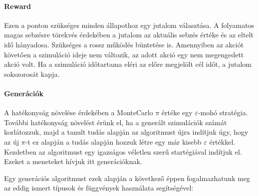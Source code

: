 \documentclass[12pt]{article}
\begin{document}
\paragraph{Reward} 
Ezen a ponton szükséges minden állapothoz egy jutalom választása. A folyamatos magas sebzésre törekvés érdekében a jutalom az aktuális sebzés értéke és az eltelt idő hányadosa. Szükséges a rossz működés büntetése is. Amennyiben az akciót követően a szimuláció ideje nem változik, az adott akció egy nem megengedett akció volt. Ha a szimuláció időtartama eléri az előre megjelölt cél időt, a jutalom sokszorosát kapja.

\paragraph{Generációk}
A hatékonyság növelése érdekében a MonteCarlo $\pi$ értéke egy $\varepsilon$-mohó stratégia. További hatékonyság növelést érünk el, ha a generált szimulációk számát korlátozzuk, majd a tanult tudás alapján az algoritmust újra indítjuk úgy, hogy az új $\pi$-t ez alapján a tudás alapján hozzuk létre egy már kisebb $\varepsilon$ értékkel. Kezdetben az algoritmust egy igazságos véletlen szerű startégiával indítjuk el. Ezeket a meneteket hívjuk itt generációknak.

Egy generációs algoritmust ezek alapján a következő éppen fogalmazhatunk meg az eddig ismert típusok és függvények használata segítségével:

\vspace{1cm}
\noindent{}
\vspace{1.5 em}
\end{document}
